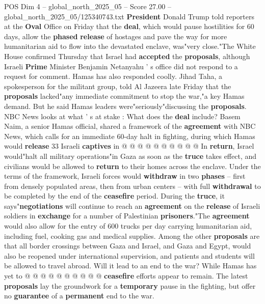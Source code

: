 \begin{textsample}{POS Dim 4 – global\_north\_2025\_05 – Score 27.00 – global\_north\_2025\_05/125340743.txt}  \label{ex:f4_pos_213}
\textbf{President} Donald Trump told reporters at the \textbf{Oval} Office on Friday that the \textbf{deal}, which would pause hostilities for 60 days, allow the \textbf{phased} \textbf{release} of hostages and pave the way for more humanitarian aid to flow into the devastated enclave, was"very close."The White House confirmed Thursday that Israel had \textbf{accepted} the \textbf{proposals}, although Israeli \textbf{Prime} Minister Benjamin Netanyahu ' s office did not respond to a request for comment.
Hamas has also responded coolly.
Jihad Taha, a spokesperson for the militant group, told Al Jazeera late Friday that the \textbf{proposals} lacked"any immediate commitment to stop the war,"a key Hamas demand.
But he said Hamas leaders were"seriously"discussing the \textbf{proposals}.
NBC News looks at what ' s at stake : What does the \textbf{deal} include?
Basem Naim, a senior Hamas official, shared a framework of the \textbf{agreement} with NBC News, which calls for an immediate 60-day halt in fighting, during which Hamas would \textbf{release} 33 Israeli \textbf{captives} in @ @ @ @ @ @ @ @ @ @ In \textbf{return}, Israel would"halt all military operations"in Gaza as soon as the \textbf{truce} takes effect, and civilians would be allowed to \textbf{return} to their homes across the enclave.
Under the terms of the framework, Israeli forces would \textbf{withdraw} in two \textbf{phases} -- first from densely populated areas, then from urban centers -- with full \textbf{withdrawal} to be completed by the end of the \textbf{ceasefire} period.
During the \textbf{truce}, it says"\textbf{negotiations} will continue to reach an \textbf{agreement} on the \textbf{release} of Israeli soldiers in \textbf{exchange} for a number of Palestinian \textbf{prisoners}."The \textbf{agreement} would also allow for the entry of 600 trucks per day carrying humanitarian aid, including fuel, cooking gas and medical supplies.
Among the other \textbf{proposals} are that all border crossings between Gaza and Israel, and Gaza and Egypt, would also be reopened under international supervision, and patients and students will be allowed to travel abroad.
Will it lead to an end to the war?
While Hamas has yet to @ @ @ @ @ @ @ @ @ @ \textbf{ceasefire} efforts appear to remain.
The latest \textbf{proposals} lay the groundwork for a \textbf{temporary} pause in the fighting, but offer no \textbf{guarantee} of a \textbf{permanent} end to the war.

\end{textsample}
